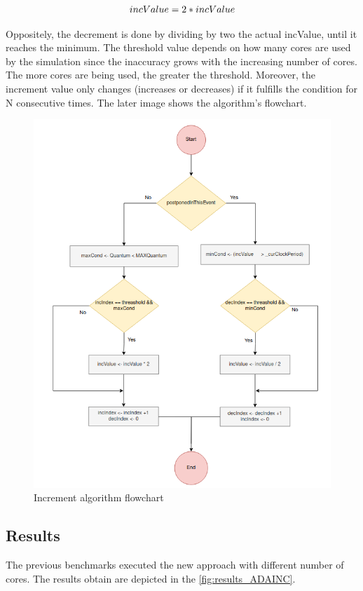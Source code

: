 \begin{equation}
    \label{eq_incValue}
    \centering
        \Large
        incValue = 2 * incValue
        \normalsize
\end{equation}
\vspace{0.3cm}

Oppositely, the decrement is done by dividing by two the actual incValue, until it reaches the minimum. The threshold value depends on how many cores are used by the simulation since the inaccuracy grows with the increasing number of cores. The more cores are being used, the greater the threshold. Moreover, the increment value only changes (increases or decreases) if it fulfills the condition for N consecutive times. The later image shows the algorithm's flowchart. 

\begin{figure}[H]
	\centering
 	\includegraphics[width=0.7\linewidth]{Images/incAlgorithm_flowchart.png}
 	\caption{Increment algorithm flowchart}
	 \label{fig_incAlgorithm_flowchart}
\end{figure}

\subsection{Results}

The previous benchmarks executed the new approach with different number of cores. The results obtain are depicted in the \autoref{fig:results_ADAINC}. 

